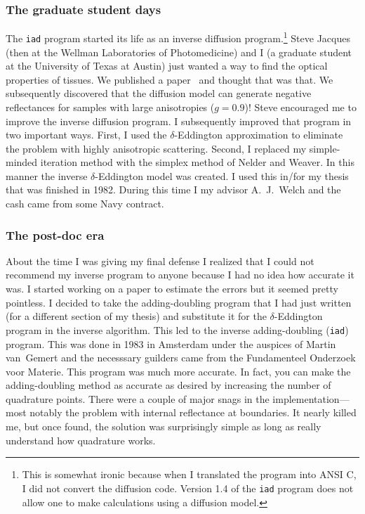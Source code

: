 \documentclass{article}
\newcommand\iadprog{\texttt{iad}}
\begin{document}
\subsubsection*{The graduate student days}
The \iadprog{} program started its life as an inverse diffusion program.\footnote{
This is somewhat ironic because when I translated the program into ANSI C, I did
not convert the diffusion code.  Version 1.4 of the \iadprog{} program does not allow
one to make calculations using a diffusion model.} Steve Jacques (then at the Wellman
Laboratories of Photomedicine) and I (a graduate student at the University of Texas at
Austin) just
wanted a way to find the optical properties of tissues. We published a paper~\cite{jacques87a} and thought that was that.  We subsequently discovered that
the diffusion model can generate negative reflectances for samples with large
anisotropies ($g=0.9$)!  Steve encouraged me to improve the inverse diffusion
program.  I subsequently improved that program in two important ways.  First, I
used the $\delta$-Eddington approximation to eliminate the problem with highly
anisotropic scattering. Second, I replaced my simple-minded iteration method with the
simplex method of Nelder and Weaver.  In this manner the inverse $\delta$-Eddington
model was created.  I used this in/for my thesis that was finished in 1982. 
During this time I my advisor
A.\ J.\ Welch and the cash came from some Navy contract.

\subsubsection*{The post-doc era}
About the time I was giving my final defense I realized that I could not
recommend my inverse program to anyone because I had no idea how accurate it
was.  I started working on a paper to estimate the errors but it seemed pretty
pointless.  I decided to take the adding-doubling program that I had just written
(for a different section of my thesis)
and substitute it for the $\delta$-Eddington program in the inverse algorithm. This
led to the inverse adding-doubling (\iadprog{}) program.  This was done in 1983 in Amsterdam
under the auspices of Martin van~Gemert and the necesssary guilders came from the Fundamenteel
Onderzoek voor Materie.  This program was much more accurate.  In fact, you can
make the adding-doubling method as accurate as desired by increasing the number
of quadrature points.  There were a couple of major snags in the implementation---most notably the
problem with internal reflectance at boundaries.  It nearly killed me, but once found, the solution was
surprisingly simple as long as really understand how quadrature works.
\end{document}
